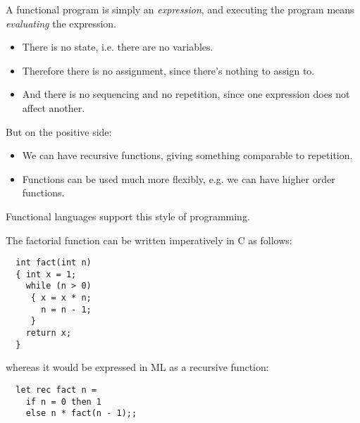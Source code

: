 \begin{slide*}


\vspace*{0.2cm}

A functional program is simply an {\em expression}, and executing the program
means {\em evaluating} the expression.

\begin{itemize}

\item There is no state, i.e. there are {\red no variables}.

\item Therefore there is {\red no assignment}, since there's nothing to assign
to.

\item And there is {\red no sequencing} and {\red no repetition}, since one
expression does not affect another.

\end{itemize}

But on the positive side:

\begin{itemize}

\item We can have {\red recursive functions}, giving something comparable to
repetition.

\item Functions can be used much more flexibly, e.g. we can have {\red higher
order functions}.

\end{itemize}

Functional languages support this style of programming.


\end{slide*}


\begin{slide*}


\vspace*{0.5cm}

The factorial function can be written imperatively in C as follows:

\begin{red}\begin{verbatim}
  int fact(int n)
  { int x = 1;
    while (n > 0)
     { x = x * n;
       n = n - 1;
     }
    return x;
  }
\end{verbatim}\end{red}

\noindent whereas it would be expressed in ML as a recursive function:

\begin{red}\begin{verbatim}
  let rec fact n =
    if n = 0 then 1
    else n * fact(n - 1);;
\end{verbatim}\end{red}

\end{slide*}



